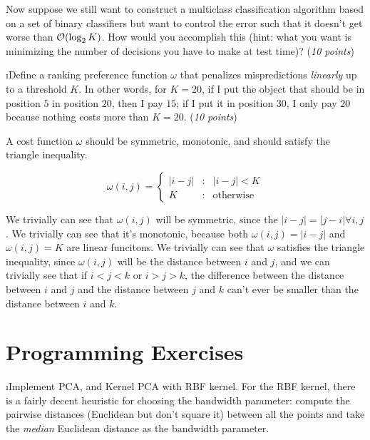 \documentclass[fleqn]{article}
\begin{document}
Now suppose we still want to construct a multiclass classification algorithm
based on a set of binary classifiers but want to control the error such that
it doesn't get worse than $\mathcal{O}(\log_2 K)$. How would you accomplish this (hint:
what you want is minimizing the number of decisions you have to make at test time)?
(\emph{10 points})

\i Define a ranking preference function $\omega$ that penalizes
mispredictions \emph{linearly} up to a threshold $K$.  In other
words, for $K=20$, if I put the object that should be in position
$5$ in position $20$, then I pay $15$; if I put it in position
$30$, I only pay $20$ because nothing costs more than $K=20$.
(\emph{10 points})

\begin{solution}

A cost function $\omega$ should be symmetric, monotonic, and should satisfy the triangle inequality. 

\begin{displaymath}
   \omega(i,j) = \left\{
     \begin{array}{lrl}
       |i-j| & : & |i-j| < K\\
       K & : & \text{otherwise}
     \end{array}
   \right.
\end{displaymath}

We trivially can see that $\omega(i,j)$ will be symmetric, since the $|i-j| = |j-i| \forall i,j$. We trivially can see that it's monotonic, because both $\omega(i,j) = |i-j|$ and $\omega(i,j) = K$ are linear funcitons. We trivially can see that $\omega$ satisfies the triangle inequality, since $\omega(i,j)$ will be the distance between $i$ and $j$, and we can trivially see that if $i < j < k$ or $i > j > k$, the difference between the distance between $i$ and $j$ and the distance between $j$ and $k$ can't ever be smaller than the distance between $i$ and $k$.

\end{solution}

\ene

\section{Programming Exercises}

\bee

\i Implement PCA, and Kernel PCA with RBF kernel. For the RBF kernel,
there is a fairly decent heuristic for choosing the bandwidth parameter: 
compute the pairwise distances (Euclidean but don't square it) between all 
the points and take the \emph{median} Euclidean distance as the bandwidth
parameter. 
\end{document}

